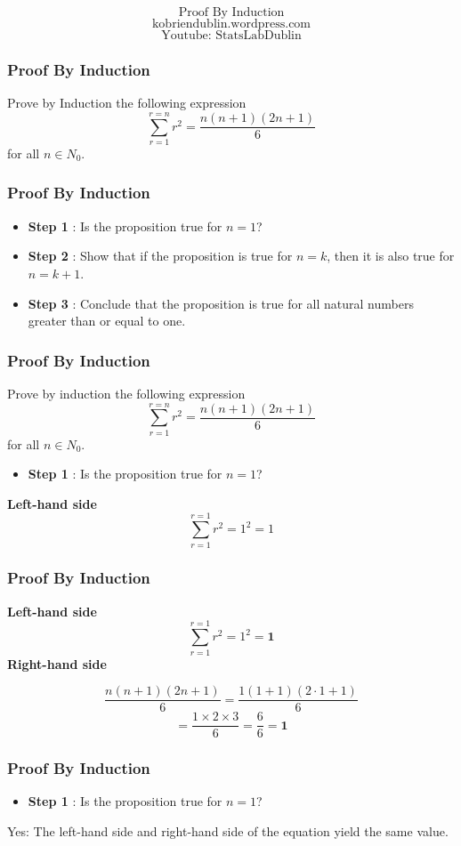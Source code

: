 \documentclass{beamer}
\begin{document}
\begin{frame}
\bigskip
{
\Huge
\[ \mbox{Proof By Induction}\]
}
{
\Large
\[ \mbox{kobriendublin.wordpress.com}\]
\[ \mbox{Youtube: StatsLabDublin}\]
}
\end{frame}
\begin{frame}
\frametitle{Proof By Induction}
\Large
Prove by Induction the following expression
\[ \sum_{r=1}^{r=n} r^2 = \frac{n(n+1)(2n+1)}{6} \]
for all $n \in N_0$.
\end{frame}
\begin{frame}
\frametitle{Proof By Induction}
\vspace{-1cm}
\Large
\begin{itemize}
\item \textbf{Step 1} : Is the proposition true for $n = 1$?
\item \textbf{Step 2} : Show that if the proposition is true for $n=k$, then it is also true for $n=k+1$.
\item \textbf{Step 3} : Conclude that the proposition is true for all natural numbers greater than or equal to one.
\end{itemize}
\end{frame}
\begin{frame}
\frametitle{Proof By Induction}
\Large
Prove by induction the following expression
\[ \sum_{r=1}^{r=n} r^2 = \frac{n(n+1)(2n+1)}{6} \]
for all $n \in N_0$.
\begin{itemize}
\item \textbf{Step 1} : Is the proposition true for $n = 1$? 
\end{itemize}
\textbf{Left-hand side}
\[ \sum_{r=1}^{r=1} r^2 = 1^2 = 1 \]


\end{frame}
\begin{frame}
\frametitle{Proof By Induction}
\Large
\textbf{Left-hand side}
\[ \sum_{r=1}^{r=1} r^2 = 1^2 = \boldsymbol{1} \]
\textbf{Right-hand side}

\[ \frac{n(n+1)(2n+1)}{6}  = \frac{1(1+1)(2\cdot 1+1)}{6} \]
\[  = \frac{1\times 2 \times 3}{6} = \frac{6}{6}=\boldsymbol{1} \]
\end{frame}
\begin{frame}
\frametitle{Proof By Induction}
\Large
\begin{itemize}
\item \textbf{Step 1} : Is the proposition true for $n = 1$? 
\end{itemize}
\bigskip
Yes: The left-hand side and right-hand side of the equation yield the same value.

\end{frame}
\end{document}
